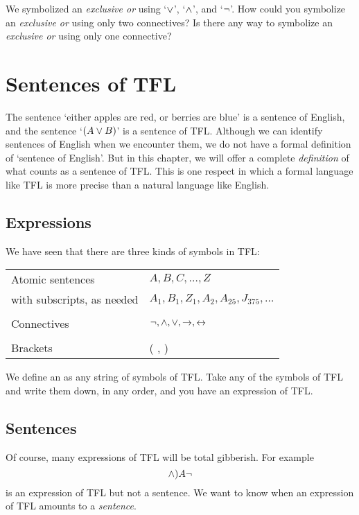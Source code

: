 \problempart
We symbolized an \emph{exclusive or} using `$\vee$', `$\wedge$', and `$\neg$'. How could you symbolize an \emph{exclusive or} using only two connectives? Is there any way to symbolize an \emph{exclusive or} using only one connective?


\chapter{Sentences of TFL}\label{s:TFLSentences}
The sentence `either apples are red, or berries are blue' is a sentence of English, and the sentence `$(A\vee B)$' is a sentence of TFL. Although we can identify sentences of English when we encounter them, we do not have a formal definition of `sentence of English'. But in this chapter, we will offer a complete \emph{definition} of what counts as a sentence of TFL. This is one respect in which a formal language like TFL is more precise than a natural language like English.


\section{Expressions}

We have seen that there are three kinds of symbols in TFL:
\begin{center}
\begin{tabular}{l l}
Atomic sentences & $A,B,C,\ldots,Z$\\
with subscripts, as needed & $A_1, B_1,Z_1,A_2,A_{25},J_{375},\ldots$\\
\\
Connectives & $\neg,\wedge,\vee,\rightarrow,\leftrightarrow$\\
\\
Brackets &( , )\\
\end{tabular}
\end{center}
We define an  as any string of symbols of TFL. Take any of the symbols of TFL and write them down, in any order, and you have an expression of TFL.


\section{Sentences}\label{S.sentsTFL}
Of course, many expressions of TFL will be total gibberish. For example $$\wedge)A\neg$$ is an expression of TFL but not a sentence. We want to know when an expression of TFL amounts to a \emph{sentence}. 

